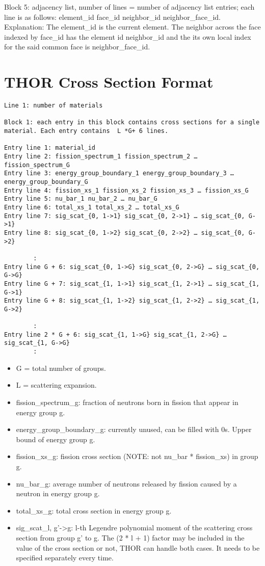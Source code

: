 \noindent Block 5: adjacency list, number of lines = number of adjacency list entries; each line is as follows: element\_id face\_id neighbor\_id neighbor\_face\_id.
Explanation: The element\_id is the current element. The neighbor across the face indexed by face\_id has the element id neighbor\_id and the its own local index for the said common face is neighbor\_face\_id.

\section{THOR Cross Section Format}\label{ch:inp:sec:xsfile}
\begin{verbatim}
Line 1: number of materials

Block 1: each entry in this block contains cross sections for a single material. Each entry contains  L *G+ 6 lines.

Entry line 1: material_id
Entry line 2: fission_spectrum_1 fission_spectrum_2 … fission_spectrum_G
Entry line 3: energy_group_boundary_1 energy_group_boundary_3 … energy_group_boundary_G
Entry line 4: fission_xs_1 fission_xs_2 fission_xs_3 … fission_xs_G
Entry line 5: nu_bar_1 nu_bar_2 … nu_bar_G
Entry line 6: total_xs_1 total_xs_2 … total_xs_G
Entry line 7: sig_scat_{0, 1->1} sig_scat_{0, 2->1} … sig_scat_{0, G->1}
Entry line 8: sig_scat_{0, 1->2} sig_scat_{0, 2->2} … sig_scat_{0, G->2}

        :
Entry line G + 6: sig_scat_{0, 1->G} sig_scat_{0, 2->G} … sig_scat_{0, G->G}
Entry line G + 7: sig_scat_{1, 1->1} sig_scat_{1, 2->1} … sig_scat_{1, G->1}
Entry line G + 8: sig_scat_{1, 1->2} sig_scat_{1, 2->2} … sig_scat_{1, G->2}

        :
Entry line 2 * G + 6: sig_scat_{1, 1->G} sig_scat_{1, 2->G} … sig_scat_{1, G->G}
        :

\end{verbatim}

\begin{itemize}
\item G = total number of groups.
\item L = scattering expansion.
\item fission\_spectrum\_g: fraction of neutrons born in fission that appear in energy group g.
\item energy\_group\_boundary\_g: currently unused, can be filled with 0s. Upper bound of energy group g.
\item fission\_xs\_g: fission cross section (NOTE: not nu\_bar * fission\_xs) in group g.
\item nu\_bar\_g: average number of neutrons released by fission caused by a neutron in energy group g.
\item total\_xs\_g: total cross section in energy group g.
\item sig\_scat\_{l, g’->g}: l-th Legendre polynomial moment of the scattering cross section from group g’ to g. The (2 * l + 1) factor may be included in the value of the cross section or not, THOR can handle both cases. It needs to be specified separately every time.
\end{itemize}



